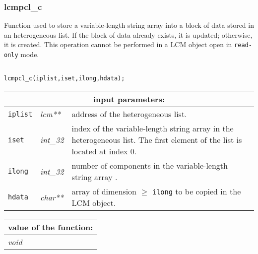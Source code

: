 \subsubsection{lcmpcl\_c}\label{sect:lcmpclc}

Function used to store a variable-length string array into a block of data stored in an heterogeneous list.
If the block of data already exists, it is updated; otherwise, it is created. This operation cannot be performed
in a LCM object open in {\tt read-only} mode.

\begin{verbatim}

lcmpcl_c(iplist,iset,ilong,hdata);
\end{verbatim}

\noindent
\begin{tabular}{|p{1.5cm}|p{2cm}|p{11cm}|}
\hline
\multicolumn{3}{|c|}{\bf input parameters:} \\
\hline
{\tt iplist} & {\it lcm**} & address of the heterogeneous list. \\
\hline
{\tt iset} & {\it int\_32} &index of the variable-length string array in the heterogeneous list.
The first element of the list is located at index $0$. \\
\hline
{\tt ilong} & {\it int\_32} & number of components in the variable-length string array .\\
\hline
{\tt hdata} & {\it char**} & array of dimension $\ge$ {\tt ilong} to be copied in the LCM object. \\
\hline
\end{tabular}

\vskip 0.8cm

\noindent
\begin{tabular}{|p{4.0cm}|p{11cm}|}
\hline
\multicolumn{2}{|c|}{\bf value of the function:} \\
\hline
{\it void} &  \\
\hline
\end{tabular}

\vskip 0.4cm


